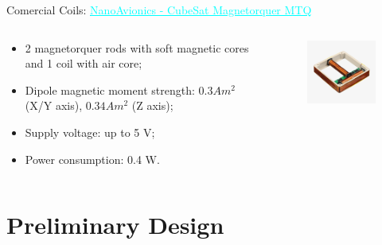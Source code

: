 \documentclass{beamer}
\begin{document}
\begin{frame}{Comercial Coils: \href{https://nanoavionics.com/cubesat-components/cubesat-magnetorquer-satbus-mtq/}{\textcolor{cyan}{\underline{NanoAvionics - CubeSat Magnetorquer MTQ}}}}

    \begin{columns}[t]
        \begin{column}[t]{0.5\textwidth}
            \begin{itemize}
                \item 2 magnetorquer rods with soft magnetic cores and 1 coil with air core;
                \item Dipole magnetic moment strength: $0.3 Am^2$ (X/Y axis), $0.34 Am^2$ (Z axis);
                \item Supply voltage: up to 5 V;
                \item Power consumption: 0.4 W.
            \end{itemize}
        \end{column}
        \begin{column}[t]{0.5\textwidth}
            \begin{figure}[!ht]
                \begin{center}
                    \includegraphics[width=4.5cm]{figures/magnetorquers-nanoavionics.png}
                \end{center}
            \end{figure}
        \end{column}
    \end{columns}
    
\end{frame}
        
\section{Preliminary Design}
\end{document}
